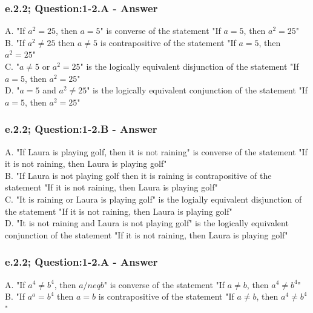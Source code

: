 \subsubsection*{e.2.2; Question:1-2.A - Answer}
A.  "If $a^2=25$, then $a=5$" is converse of the statement "If $a=5$, then $a^2=25$" \\

B. "If $a^2 \neq 25$ then $a \neq 5$ is contrapositive of the statement "If $a=5$, then $a^2=25$" \\

C. "$a \neq 5$ or $a^2=25$" is the logically equivalent disjunction of the statement "If $a=5$, then $a^2=25$" \\

D. "$a = 5$ and $a^2 \neq 25$" is the logically equivalent conjunction of the statement "If $a=5$, then $a^2=25$" \\

\subsubsection*{e.2.2; Question:1-2.B - Answer}
A. "If Laura is playing golf, then it is not raining" is converse of the statement "If it is not raining, then Laura is playing golf" \\

B. "If Laura is not playing golf then it is raining is contrapositive of the statement "If it is not raining, then Laura is playing golf" \\

C. "It is raining or Laura is playing golf" is the logially equivalent disjunction of the statement "If it is not raining, then Laura is playing golf" \\

D. "It is not raining and Laura is not playing golf" is the logically equivalent conjunction of the statement "If it is not raining, then Laura is playing golf" \\

\subsubsection*{e.2.2; Question:1-2.A - Answer}
A. "If $a^4 \neq b^4$, then $a /neq b$" is converse of the statement "If $a \neq b$, then $a^4 \neq b^4$" \\

B. "If $a^a = b^4$ then $a = b$ is contrapositive of the statement "If $a \neq b$, then $a^4 \neq b^4$" \\

